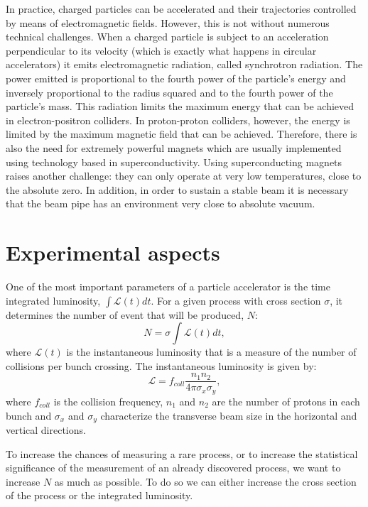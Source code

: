 In practice, charged particles can be accelerated and their trajectories controlled by means of electromagnetic fields. However, this is not without numerous technical challenges. When a charged particle is subject to an acceleration perpendicular to its velocity (which is exactly what happens in circular accelerators) it emits electromagnetic radiation, called synchrotron radiation. The power emitted is proportional to the fourth power of the particle's energy and inversely proportional to the radius squared and to the fourth power of the particle's mass. This radiation limits the maximum energy that can be achieved in electron-positron colliders. In proton-proton colliders, however, the energy is limited by the maximum magnetic field that can be achieved. Therefore, there is also the need for extremely powerful magnets which are usually implemented using technology based in superconductivity. Using superconducting magnets raises another challenge: they can only operate at very low temperatures, close to the absolute zero. In addition, in order to sustain a stable beam it is necessary that the beam pipe has an environment very close to absolute vacuum.   

\section{Experimental aspects}

One of the most important parameters of a particle accelerator is the time integrated luminosity, $\int \mathcal{L}(t) dt$. For a given process with cross section $\sigma$, it determines the number of event that will be produced, $N$:
\begin{equation}
N=\sigma \int \mathcal{L}(t) dt,
\label{eq:n_events}
\end{equation}
where $\mathcal{L}(t)$ is the instantaneous luminosity that is a measure of the number of collisions per bunch crossing.
The instantaneous luminosity is given by:
\begin{equation}
\mathcal{L}=f_{coll}\frac{n_1 n_2}{4\pi\sigma_x \sigma_y},
\label{eq:inst_lumi}
\end{equation}
where $f_{coll}$ is the collision frequency, $n_1$ and $n_2$ are the number of protons in each bunch and $\sigma_x$ and $\sigma_y$ characterize the transverse beam size in the horizontal and vertical directions.

To increase the chances of measuring a rare process, or to increase the statistical significance of the measurement of an already discovered process, we want to increase $N$ as much as possible. To do so we can either increase the cross section of the process or the integrated luminosity. 

